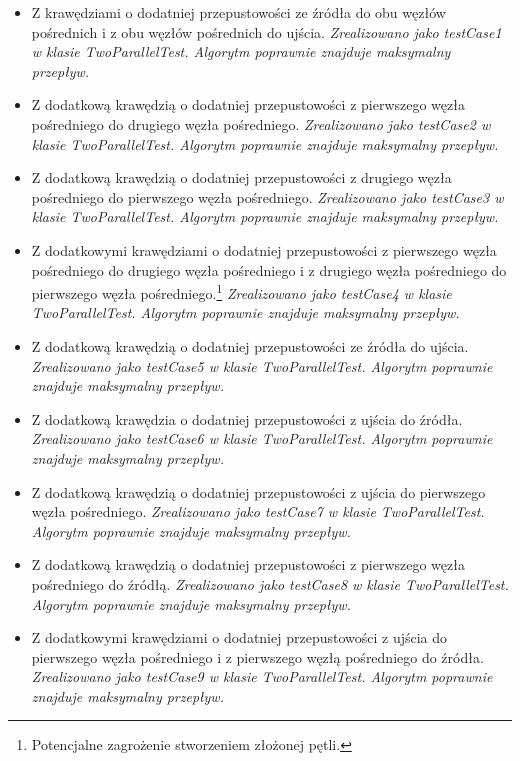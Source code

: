 \begin{itemize}[nosep]
    \item Z krawędziami o dodatniej przepustowości ze źródła do obu węzłów
    pośrednich i z obu węzłów pośrednich do ujścia.
    \emph{Zrealizowano jako testCase1 w klasie TwoParallelTest. Algorytm
    poprawnie znajduje maksymalny przepływ.}

    \item Z dodatkową krawędzią o dodatniej przepustowości z pierwszego węzła
    pośredniego do drugiego węzła pośredniego.
    \emph{Zrealizowano jako testCase2 w klasie TwoParallelTest. Algorytm
    poprawnie znajduje maksymalny przepływ.}

    \item Z dodatkową krawędzią o dodatniej przepustowości z drugiego węzła
    pośredniego do pierwszego węzła pośredniego.
    \emph{Zrealizowano jako testCase3 w klasie TwoParallelTest. Algorytm
    poprawnie znajduje maksymalny przepływ.}

    \item Z dodatkowymi krawędziami o dodatniej przepustowości z pierwszego
    węzła pośredniego do drugiego węzła pośredniego i z drugiego węzła
    pośredniego do pierwszego węzła pośredniego.\footnote{Potencjalne zagrożenie
    stworzeniem złożonej pętli.}
    \emph{Zrealizowano jako testCase4 w klasie TwoParallelTest. Algorytm
    poprawnie znajduje maksymalny przepływ.}

    \item Z dodatkową krawędzią o dodatniej przepustowości ze źródła do ujścia.
    \emph{Zrealizowano jako testCase5 w klasie TwoParallelTest. Algorytm
    poprawnie znajduje maksymalny przepływ.}

    \item Z dodatkową krawędzia o dodatniej przepustowości z ujścia do źródła.
    \emph{Zrealizowano jako testCase6 w klasie TwoParallelTest. Algorytm
    poprawnie znajduje maksymalny przepływ.}

    \item Z dodatkową krawędzią o dodatniej przepustowości z ujścia do
    pierwszego węzła pośredniego.
    \emph{Zrealizowano jako testCase7 w klasie TwoParallelTest. Algorytm
    poprawnie znajduje maksymalny przepływ.}

    \item Z dodatkową krawędzią o dodatniej przepustowości z pierwszego węzła
    pośredniego do źródłą.
    \emph{Zrealizowano jako testCase8 w klasie TwoParallelTest. Algorytm
    poprawnie znajduje maksymalny przepływ.}

    \item Z dodatkowymi krawędziami o dodatniej przepustowości z ujścia do
    pierwszego węzła pośredniego i z pierwszego węzłą pośredniego do źródła.
    \emph{Zrealizowano jako testCase9 w klasie TwoParallelTest. Algorytm
    poprawnie znajduje maksymalny przepływ.}
\end{itemize}


